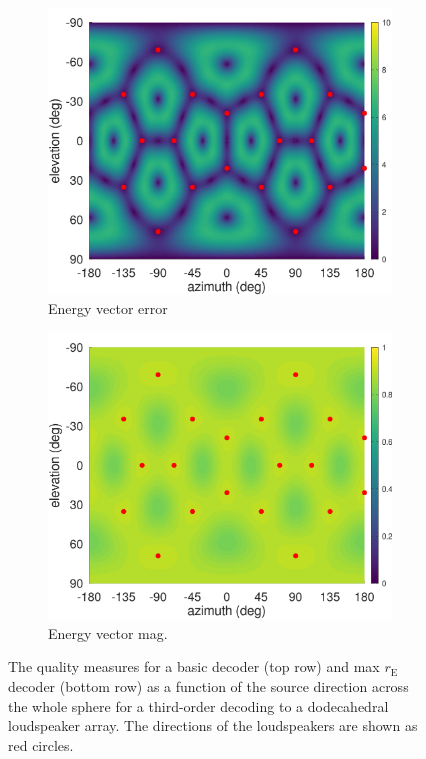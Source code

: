 \documentclass[12pt]{report}
\begin{document}
\begin{figure}[tbp]
\begin{subfigure}{0.3\textwidth}
    \includegraphics[width=\linewidth]{figures/errAzE_dodeca.png}
    \caption{\centering Energy vector error}
  \end{subfigure}
  \hfill
  \begin{subfigure}{0.3\textwidth}
    \includegraphics[width=\linewidth]{figures/rE_dodeca.png}
    \caption{\centering Energy vector mag.}
  \end{subfigure}
    \caption{The quality measures for a basic decoder (top row) and max $r_{\mathrm{E}}$ decoder (bottom row) as a function of the source direction across the whole sphere for a third-order decoding to a dodecahedral loudspeaker array.
    The directions of the loudspeakers are shown as red circles.}
  \label{fig:dodeca_third_order}
\end{figure}
\end{document}
